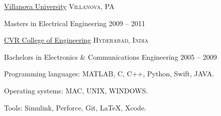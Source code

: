 \documentclass[12pt,a4paper]{article} %
\begin{document}

\headedsection %
{\href{http://www.villanova.edu}{Villanova University}}
{\textsc{Villanova, PA}} {

\headedsubsection %
{Masters in Electrical Engineering }
{2009 -- 2011}
{\bodytext{

}}
}


\headedsection %
{\href{http://www.cvr.ac.in}{CVR College of Engineering}}
{\textsc{Hyderabad, India}} {

\headedsubsection %
{Bachelors in Electronics \& Communications Engineering }
{2005 -- 2009} 
{\bodytext{


}}
}


\spacedhrule{0.5em}{-0.4em} %



\inlineheadsection %
{Programming languages:}
{MATLAB, C, C++, Python, Swift, JAVA.}

\inlineheadsection %
{Operating systems:}
{MAC, UNIX, WINDOWS.}

\inlineheadsection %
{Tools:}
{Simulink, Perforce, Git, \LaTeX, Xcode.}



\spacedhrule{1.6em}{-0.4em} %

\end{document}
